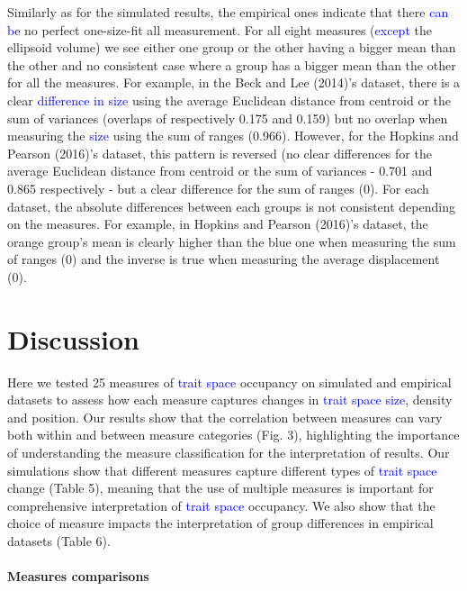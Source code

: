 \documentclass[]{article}
\let\oldparagraph\paragraph
\renewcommand{\paragraph}[1]{\oldparagraph{#1}\mbox{}}
\begin{document}
\renewcommand\baselinestretch{1.6}\selectfont

Similarly as for the simulated results, the empirical ones indicate that
there \textcolor{blue}{can be} no perfect one-size-fit all
measurement. For all eight measures
(\textcolor{blue}{except} the ellipsoid volume) we see
either one group or the other having a bigger mean than the other and no
consistent case where a group has a bigger mean than the other for all
the measures. For example, in the Beck and Lee (2014)'s dataset, there
is a clear \textcolor{blue}{difference in size} using the
average Euclidean distance from centroid or the sum of variances
(overlaps of respectively 0.175 and 0.159) but no overlap when measuring
the \textcolor{blue}{size} using the sum of ranges (0.966).
However, for the Hopkins and Pearson (2016)'s dataset, this pattern is
reversed (no clear differences for the average Euclidean distance from
centroid or the sum of variances - 0.701 and 0.865 respectively - but a
clear difference for the sum of ranges (0). For each dataset, the
absolute differences between each groups is not consistent depending on
the measures. For example, in Hopkins and Pearson (2016)'s dataset, the
orange group's mean is clearly higher than the blue one when measuring
the sum of ranges (0) and the inverse is true when measuring the average
displacement (0).

\section{Discussion}\label{discussion}

Here we tested 25 measures of \textcolor{blue}{trait space}
occupancy on simulated and empirical datasets to assess how each measure
captures changes in \textcolor{blue}{trait space size},
density and position. Our results show that the correlation between
measures can vary both within and between measure categories (Fig. 3),
highlighting the importance of understanding the measure classification
for the interpretation of results. Our simulations show that different
measures capture different types of
\textcolor{blue}{trait space} change (Table 5), meaning that
the use of multiple measures is important for comprehensive
interpretation of \textcolor{blue}{trait space} occupancy.
We also show that the choice of measure impacts the interpretation of
group differences in empirical datasets (Table 6).

\paragraph{Measures comparisons}\label{measures-comparisons}
\end{document}
